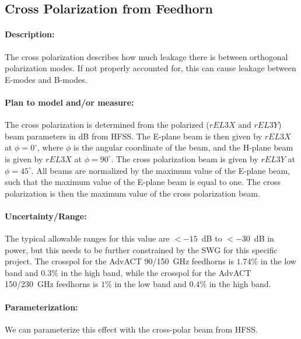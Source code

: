 \subsection{Cross Polarization from Feedhorn}

\paragraph{Description:}
The cross polarization describes how much leakage there is between orthogonal polarization modes. If not properly accounted for, this can cause leakage between E-modes and B-modes.

\paragraph{Plan to model and/or measure:}
The cross polarization is determined from the polarized ($rEL3X$ and $rEL3Y$) beam parameters in dB from HFSS. The E-plane beam is then given by $rEL3X$ at $\phi=0^{\circ}$, where $\phi$ is the angular coordinate of the beam, and the H-plane beam is given by $rEL3X$ at $\phi=90^{\circ}$. The cross polarization beam is given by $rEL3Y$ at $\phi=45^{\circ}$. All beams are normalized by the maximum value of the E-plane beam, such that the maximum value of the E-plane beam is equal to one. The cross polarization is then the maximum value of the cross polarization beam.

\paragraph{Uncertainty/Range:}
The typical allowable ranges for this value are $<-15$~dB to $<-30$~dB in power, but this needs to be further constrained by the SWG for this specific project. The crosspol for the AdvACT 90/150~GHz feedhorns is $1.74\%$ in the low band and $0.3\%$ in the high band, while the crosspol for the AdvACT 150/230~GHz feedhorns is $1\%$ in the low band and $0.4\%$ in the high band.

\paragraph{Parameterization:}
We can parameterize this effect with the cross-polar beam from HFSS.
